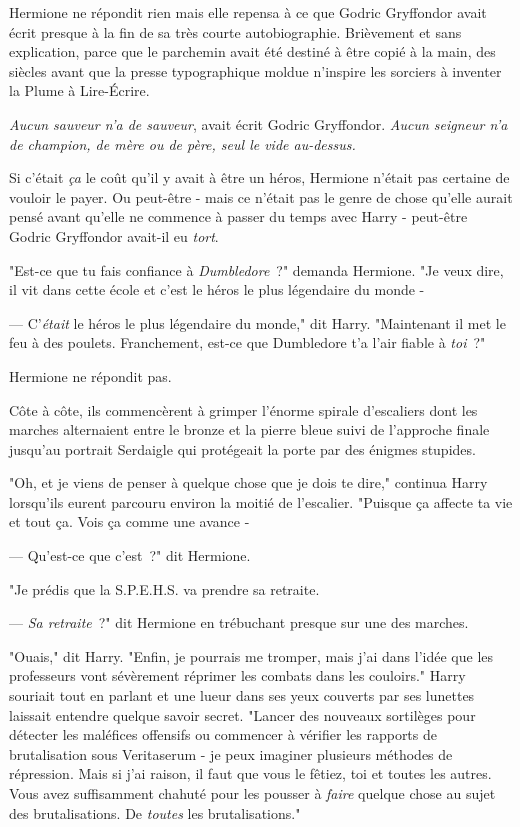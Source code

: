 Hermione ne répondit rien mais elle repensa à ce que Godric Gryffondor avait écrit presque à la fin de sa très courte autobiographie. Brièvement et sans explication, parce que le parchemin avait été destiné à être copié à la main, des siècles avant que la presse typographique moldue n'inspire les sorciers à inventer la Plume à Lire-Écrire.

\emph{Aucun sauveur n'a de sauveur}, avait écrit Godric Gryffondor. \emph{Aucun seigneur n'a de champion, de mère ou de père, seul le vide au-dessus.}

Si c'était \emph{ça} le coût qu'il y avait à être un héros, Hermione n'était pas certaine de vouloir le payer. Ou peut-être - mais ce n'était pas le genre de chose qu'elle aurait pensé avant qu'elle ne commence à passer du temps avec Harry - peut-être Godric Gryffondor avait-il eu \emph{tort}.

"Est-ce que tu fais confiance à \emph{Dumbledore}~?" demanda Hermione. "Je veux dire, il vit dans cette école et c'est le héros le plus légendaire du monde -

--- C'\emph{était} le héros le plus légendaire du monde," dit Harry. "Maintenant il met le feu à des poulets. Franchement, est-ce que Dumbledore t'a l'air fiable à \emph{toi}~?"

Hermione ne répondit pas.

Côte à côte, ils commencèrent à grimper l'énorme spirale d'escaliers dont les marches alternaient entre le bronze et la pierre bleue suivi de l'approche finale jusqu'au portrait Serdaigle qui protégeait la porte par des énigmes stupides.

"Oh, et je viens de penser à quelque chose que je dois te dire," continua Harry lorsqu'ils eurent parcouru environ la moitié de l'escalier. "Puisque ça affecte ta vie et tout ça. Vois ça comme une avance -

--- Qu'est-ce que c'est~?" dit Hermione.

"Je prédis que la S.P.E.H.S. va prendre sa retraite.

--- \emph{Sa retraite}~?" dit Hermione en trébuchant presque sur une des marches.

"Ouais," dit Harry. "Enfin, je pourrais me tromper, mais j'ai dans l'idée que les professeurs vont sévèrement réprimer les combats dans les couloirs." Harry souriait tout en parlant et une lueur dans ses yeux couverts par ses lunettes laissait entendre quelque savoir secret. "Lancer des nouveaux sortilèges pour détecter les maléfices offensifs ou commencer à vérifier les rapports de brutalisation sous Veritaserum - je peux imaginer plusieurs méthodes de répression. Mais si j'ai raison, il faut que vous le fêtiez, toi et toutes les autres. Vous avez suffisamment chahuté pour les pousser à \emph{faire} quelque chose au sujet des brutalisations. De \emph{toutes} les brutalisations."

